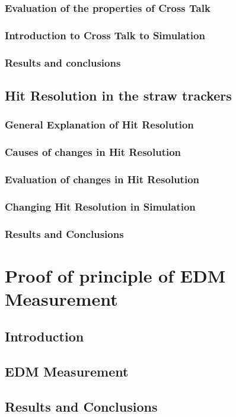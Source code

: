 \documentclass[11pt, oneside]{article}   	%
\begin{document}
		\subsubsection{Evaluation of the properties of Cross Talk}
		\subsubsection{Introduction to Cross Talk to Simulation}
		\subsubsection{Results and conclusions}
	\subsection{Hit Resolution in the straw trackers}
		\subsubsection{General Explanation of Hit Resolution}
		\subsubsection{Causes of changes in Hit Resolution}
		\subsubsection{Evaluation of changes in Hit Resolution}
		\subsubsection{Changing Hit Resolution in Simulation}
		\subsubsection{Results and Conclusions}
	
\section{Proof of principle of EDM Measurement}
	\subsection{Introduction}
	\subsection{EDM Measurement}
	\subsection{Results and Conclusions}
\end{document}
